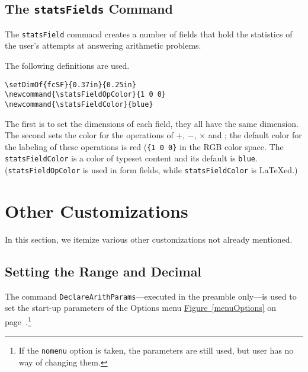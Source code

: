 \documentclass{article}
\makeatletter
\let\uif\textsf
\let\bslash=\@backslashchar
\def\cs#1{\texttt{\bslash#1}}
\makeatother
\begin{document}
\subsection{The \texorpdfstring{\protect\cs{statsFields}}{} Command}\label{statsFields}

The \cs{statsField} command creates a number of fields that hold the
statistics of the user's attempts at answering arithmetic problems.

The following definitions are used.
\begin{Verbatim}[xleftmargin=\amtIndent]
\setDimOf{fcSF}{0.37in}{0.25in}
\newcommand{\statsFieldOpColor}{1 0 0}
\newcommand{\statsFieldColor}{blue}
\end{Verbatim}
The first is to set the dimensions of each field, they all have the same
dimension. The second sets the color for the operations of $+$, $-$, $\times$
and ; the default color for the labeling of these operations is red
(\verb!{1 0 0}! in the RGB color space. The \cs{statsFieldColor} is a color
of typeset content and its default is \texttt{blue}. (\cs{statsFieldOpColor}
is used in form fields, while \cs{statsFieldColor} is {\LaTeX}ed.)

\section{Other Customizations}

In this section, we itemize various other customizations not already mentioned.

\subsection{Setting the Range and Decimal}

The command \cs{DeclareArithParams}---executed in the preamble only---is
used to set the start-up parameters of the \uif{Options} menu
\hyperref[menuOptions]{Figure~\ref*{menuOptions}} on
page~\pageref*{menuOptions}.\footnote{If the \texttt{nomenu} option is
taken, the parameters are still used, but user has no way of changing
them.}
\end{document}
